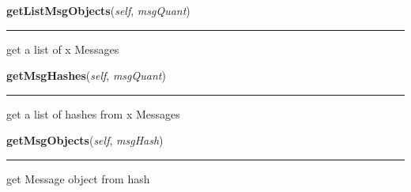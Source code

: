     \label{message:History:getListMsgObjects}

    \vspace{0.5ex}

\hspace{.8\funcindent}\begin{boxedminipage}{\funcwidth}

    \raggedright \textbf{getListMsgObjects}(\textit{self}, \textit{msgQuant})

    \vspace{-1.5ex}

    \rule{\textwidth}{0.5\fboxrule}
\setlength{\parskip}{2ex}
    get a list of x Messages

\setlength{\parskip}{1ex}
    \end{boxedminipage}

    \label{message:History:getMsgHashes}

    \vspace{0.5ex}

\hspace{.8\funcindent}\begin{boxedminipage}{\funcwidth}

    \raggedright \textbf{getMsgHashes}(\textit{self}, \textit{msgQuant})

    \vspace{-1.5ex}

    \rule{\textwidth}{0.5\fboxrule}
\setlength{\parskip}{2ex}
    get a list of hashes from x Messages

\setlength{\parskip}{1ex}
    \end{boxedminipage}

    \label{message:History:getMsgObjects}

    \vspace{0.5ex}

\hspace{.8\funcindent}\begin{boxedminipage}{\funcwidth}

    \raggedright \textbf{getMsgObjects}(\textit{self}, \textit{msgHash})

    \vspace{-1.5ex}

    \rule{\textwidth}{0.5\fboxrule}
\setlength{\parskip}{2ex}
    get Message object from hash

\setlength{\parskip}{1ex}
    \end{boxedminipage}

